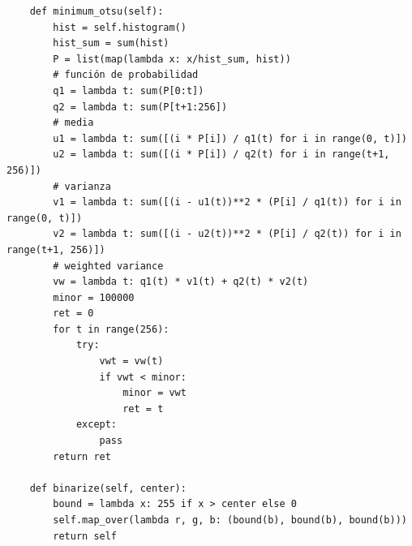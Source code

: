 \documentclass[letter]{article}
\begin{document}
\begin{verbatim}
    def minimum_otsu(self):
        hist = self.histogram()
        hist_sum = sum(hist)
        P = list(map(lambda x: x/hist_sum, hist))
        # función de probabilidad
        q1 = lambda t: sum(P[0:t])
        q2 = lambda t: sum(P[t+1:256])
        # media
        u1 = lambda t: sum([(i * P[i]) / q1(t) for i in range(0, t)])
        u2 = lambda t: sum([(i * P[i]) / q2(t) for i in range(t+1, 256)])
        # varianza
        v1 = lambda t: sum([(i - u1(t))**2 * (P[i] / q1(t)) for i in range(0, t)])
        v2 = lambda t: sum([(i - u2(t))**2 * (P[i] / q2(t)) for i in range(t+1, 256)])
        # weighted variance
        vw = lambda t: q1(t) * v1(t) + q2(t) * v2(t)
        minor = 100000
        ret = 0
        for t in range(256):
            try:
                vwt = vw(t)
                if vwt < minor:
                    minor = vwt
                    ret = t
            except:
                pass
        return ret

    def binarize(self, center):
        bound = lambda x: 255 if x > center else 0
        self.map_over(lambda r, g, b: (bound(b), bound(b), bound(b)))
        return self
\end{verbatim}
\end{document}
